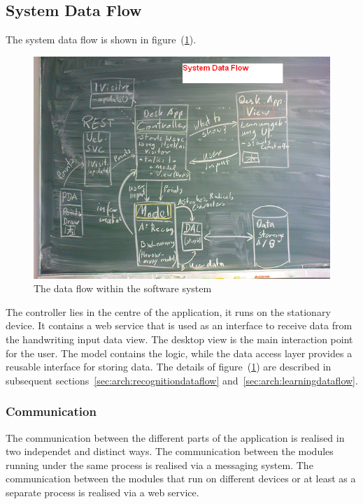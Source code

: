 \subsection{System Data Flow}
\label{sec:arch:systemdataflow}
The system data flow is shown in figure~(\ref{fig:systemdataflow}).
\begin{figure}[htbp]
\begin{center}
\includegraphics[scale=0.5]{images/TechnicalDesign/SystemDataFlow.png}
\caption{The data flow within the software system}
\label{fig:systemdataflow}
\end{center}
\end{figure}
The controller lies in the centre of the application, it runs on the stationary
device. It contains a web service that is used as an interface to receive data 
from the handwriting input data view. The desktop view is the main interaction 
point for the user. The model contains the logic, while the data access layer 
provides a reusable interface for storing data. The details of 
figure~(\ref{fig:systemdataflow}) are described in subsequent 
sections~\ref{sec:arch:recognitiondataflow} and~\ref{sec:arch:learningdataflow}.

\subsubsection{Communication}
\label{sec:communication} %

The communication between the different parts of the application is realised 
in two independet and distinct ways. The communication between the 
modules running under the same process is realised via a messaging system. 
The communication between the modules that run on different devices
or at least as a separate process is realised via a web service.

